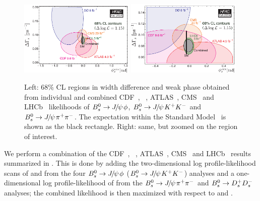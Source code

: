\begin{figure}
\begin{center}
\includegraphics[width=0.49\textwidth]{figures/life_mix/hfag_Fall2014_DGsphis}
\includegraphics[width=0.49\textwidth]{figures/life_mix/hfag_Fall2014_DGsphis_zoom}
\caption{
Left: 68\% CL regions in \Bs width difference \DGs and weak phase \phiccbars
obtained from individual and combined CDF~\cite{Aaltonen:2012ie,*CDF:2011af,*Aaltonen:2007he_mod,*Aaltonen:2007gf_mod},
\dzero~\cite{Abazov:2011ry,*Abazov_mod:2008fj,*Abazov:2007tx_mod_cont}, ATLAS~\cite{Aad:2014cqa,*Aad:2012kba_cont}, 
CMS~\cite{CMS-PAS-BPH-13-012}
and LHCb~\cite{Aaij:2014zsa,*Aaij:2013oba_supersede2,Aaij:2014dka,*Aaij:2013oba_supersede}
likelihoods of 
$B^0_s\to {J\mskip -3mu/\mskip -2mu\psi\mskip 2mu}\phi$, $B^0_s\to {J\mskip -3mu/\mskip -2mu\psi\mskip 2mu} K^+K^-$ and $B^0_s\to{J\mskip -3mu/\mskip -2mu\psi\mskip 2mu}\pi^+\pi^-$. 
The expectation within the Standard Model~\cite{Charles:2011va_mod,Lenz:2011ti,*Lenz:2006hd}
is shown as the black rectangle.
Right: same, but zoomed on the region of interest.
}
\end{center}
\end{figure}

We perform a combination of the CDF~\cite{Aaltonen:2012ie,*CDF:2011af,*Aaltonen:2007he_mod,*Aaltonen:2007gf_mod},
\dzero~\cite{Abazov:2011ry,*Abazov_mod:2008fj,*Abazov:2007tx_mod_cont},
ATLAS~\cite{Aad:2014cqa,*Aad:2012kba_cont}, CMS~\cite{CMS-PAS-BPH-13-012}
and LHCb~\cite{Aaij:2014zsa,*Aaij:2013oba_supersede2,Aaij:2014dka,*Aaij:2013oba_supersede}
results summarized in .
This is done by adding the two-dimensional log profile-likelihood scans of
\DGs and \phiccbars from the four $B^0_s\to{J\mskip -3mu/\mskip -2mu\psi\mskip 2mu}\phi$ ($B^0_s\to{J\mskip -3mu/\mskip -2mu\psi\mskip 2mu} K^+K^-$) analyses and 
a one-dimensional log profile-likelihood of \phiccbars
from the $B^0_s\to{J\mskip -3mu/\mskip -2mu\psi\mskip 2mu}\pi^+\pi^-$ and $B^0_s \to D_s^+ D_s^-$ analyses; 
the combined likelihood is then maximized with respect to \DGs and \phiccbars.

